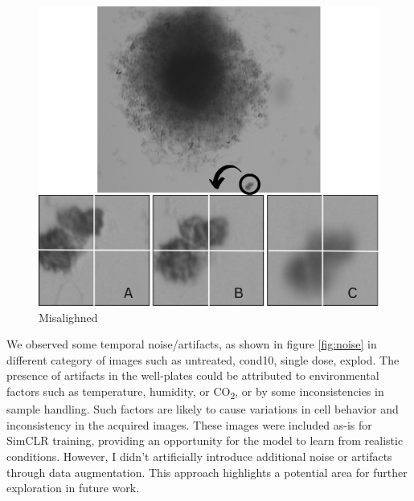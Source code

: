  \begin{figure}[H]
  \centering
  \includegraphics[scale=0.4]{figures/posi.png} 
  \caption{Misalighned}
  \label{fig:posi}
\end{figure}

We observed some temporal noise/artifacts, as shown in figure  \ref{fig:noise} in different category of images such as untreated, cond10, single dose, explod. The presence of artifacts in the well-plates could be attributed to environmental factors such
as temperature, humidity, or CO\textsubscript{2}, or by some inconsistencies in sample handling. Such factors are likely to cause variations in cell behavior and
inconsistency in the  acquired images. These images were included as-is for SimCLR training, providing an opportunity for the model to learn from realistic conditions. 
However, I didn't artificially introduce additional noise or artifacts through data augmentation. This approach highlights a potential area for further exploration in future work.
  
